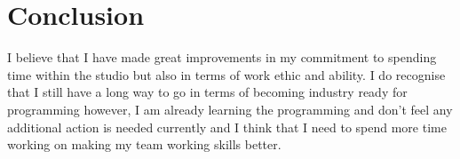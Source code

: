 \documentclass{scrartcl}
\begin{document}
\section*{Conclusion}

I believe that I have made great improvements in my commitment to spending time within the studio but also in terms of work ethic and ability. I do recognise that I still have a long way to go in terms of becoming industry ready for programming however, I am already learning the programming and don't feel any additional action is needed currently and I think that I need to spend more time working on making my team working skills better.
\end{document}
